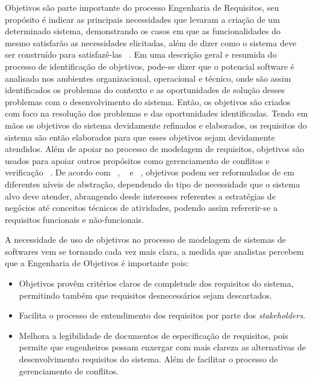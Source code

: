 
Objetivos são parte importante do processo Engenharia de Requisitos, seu propósito é indicar as principais necessidades que levaram a criação de um determinado sistema, demonstrando os casos em que as funcionalidades do mesmo satisfarão as necessidades elicitadas, além de dizer como o sistema deve ser construído para satisfazê-las ~\cite{ross1977structured}. Em uma descrição geral e resumida do processo de identificação de objetivos, pode-se dizer que o potencial software é analisado nos ambientes organizacional, operacional e técnico, onde são assim identificados os problemas do contexto e as oportunidades de solução desses problemas com o desenvolvimento do sistema. Então, os objetivos são criados com foco na resolução dos problemas e das oportunidades identificadas. Tendo em mãos os objetivos do sistema devidamente refinados e elaborados, os requisitos do sistema são então elaborados para que esses objetivos sejam devidamente atendidos. Além de apoiar no processo de modelagem de requisitos, objetivos são usados para apoiar outros propósitos como gerenciamento de conflitos e verificação ~\cite{van2001goal}. De acordo com ~\cite{van2001goal}, ~\cite{jackson1995software} e ~\cite{zave1997four}, objetivos podem ser reformulados de em diferentes níveis de abstração, dependendo do tipo de necessidade que o sistema alvo deve atender, abrangendo desde interesses referentes a estratégias de negócios até conceitos técnicos de atividades, podendo assim refererir-se a requisitos funcionais e não-funcionais.

A necessidade de uso de objetivos no processo de modelagem de sistemas de softwares vem se tornando cada vez mais clara, a medida que analistas percebem que a Engenharia de Objetivos é importante pois:
\begin{itemize}
	\item Objetivos provêm critérios claros de completude dos requisitos do sistema, permitindo também que requisitos desnecessários sejam descartados.
	\item Facilita o processo de entendimento dos requisitos por parte dos \textit{stakeholders}.
	\item Melhora a legibilidade de documentos de especificação de requisitos, pois permite que engenheiros possam enxergar com mais clareza as alternativas de desenvolvimento requisitos do sistema. Além de facilitar o processo de gerenciamento de conflitos.
	
\end{itemize}




